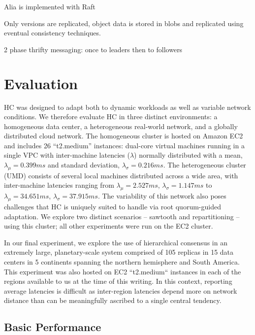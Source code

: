 \documentclass[10pt,conference]{IEEEtran}
\begin{document}
Alia is implemented with Raft

Only versions are replicated, object data is stored in blobs and replicated using
eventual consistency techniques.

2 phase thrifty messaging: once to leaders then to followers

\section{Evaluation}
\label{section:evaluation}

HC was designed to adapt both to dynamic workloads as well as variable network
conditions.
We therefore evaluate HC in three distinct environments: a homogeneous data center, a
heterogeneous real-world network, and a globally distributed cloud network.
The homogeneous cluster is hosted on Amazon EC2 and includes 26 ``t2.medium'' instances:
dual-core virtual machines running in a single VPC with inter-machine latencies
($\lambda$) normally distributed with a mean, $\lambda_{\mu}=0.399ms$ and standard
deviation, $\lambda_{\sigma}=0.216ms$.
The heterogeneous cluster (UMD) consists of several local machines distributed across a
wide area, with inter-machine latencies ranging from
$\lambda_{\mu}=2.527ms$,
$\lambda_{\sigma}=1.147ms$ to $\lambda_{\mu}=34.651ms$,
$\lambda_{\sigma}=37.915ms$.
The variability of this network also poses challenges that HC is uniquely suited to
handle via root quorum-guided adaptation.
We explore two distinct scenarios -- sawtooth and repartitioning -- using this cluster;
all other experiments were run on the EC2 cluster.

In our final experiment, we explore the use of hierarchical consensus in an extremely
large, planetary-scale system comprised of 105 replicas in 15 data centers in 5
continents spanning the northern hemisphere and South America. This experiment was also
hosted on EC2 ``t2.medium`` instances in each of the regions available to us at the time
of this writing. In this context, reporting average latencies is difficult as
inter-region latencies depend more on network distance than can be meaningfully
ascribed to a single central tendency.

\subsection{Basic Performance}
\label{section:performance}
\end{document}
